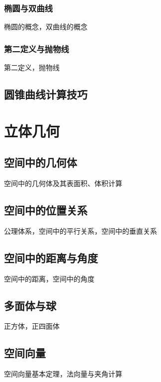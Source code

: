 \documentclass[lang=cn, zihao=4.5]{elegantbook}
\begin{document}
\subsection{椭圆与双曲线}

椭圆的概念，双曲线的概念

\subsection{第二定义与抛物线}

第二定义，抛物线

\section{圆锥曲线计算技巧}



\chapter{立体几何}

\section{空间中的几何体}

空间中的几何体及其表面积、体积计算

\section{空间中的位置关系}

公理体系，空间中的平行关系，空间中的垂直关系

\section{空间中的距离与角度}

空间中的距离，空间中的角度

\section{多面体与球}

正方体，正四面体

\section{空间向量}

空间向量基本定理，法向量与夹角计算
\end{document}
